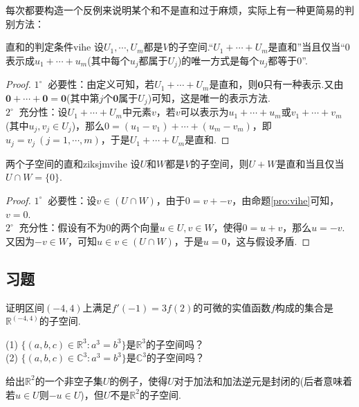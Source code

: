 \documentclass[lang=cn, zihao=5]{elegantbook}
\newcommand{\R}{\mathbb{R}}
\newcommand{\C}{\mathbb{C}}
\newcommand{\buzhou}[1]{$#1^{\circ} \ $}
\begin{document}
每次都要构造一个反例来说明某个和不是直和过于麻烦，实际上有一种更简易的判别方法：

\begin{proposition}{直和的判定条件}{vihe}
    设$U_1,\cdots ,U_m$都是$V$的子空间.“$U_1 + \cdots + U_m$是直和”当且仅当“$0$表示成$u_1+\cdots +u_m$(其中每个$u_j$都属于$U_j$)的唯一方式是每个$u_j$都等于$0$”.
\end{proposition}
\begin{proof}
    \buzhou{1} 必要性：由定义可知，若$U_1 + \cdots + U_m$是直和，则$\boldsymbol{0}$只有一种表示.又由$\boldsymbol{0} + \cdots + \boldsymbol{0} = \boldsymbol{0}$(其中第$j$个$\boldsymbol{0}$属于$U_j$)可知，这是唯一的表示方法. \\
    \buzhou{2} 充分性：设$U_1 + \cdots + U_m$中元素$v$，若$v$可以表示为$u_1 + \cdots + u_m$或$v_1 + \cdots + v_m$(其中$u_j,v_j \in U_j$)，那么$0 = (u_1 - v_1) + \cdots + (u_m - v_m)$，即$u_j=v_j ~(j=1,\cdots ,m)$，于是$U_1 + \cdots + U_m$是直和.
\end{proof}

\begin{proposition}{两个子空间的直和}{ziksjmvihe}
    设$U$和$W$都是$V$的子空间，则$U+W$是直和当且仅当$U \cap W = \{ 0 \}$.
\end{proposition}
\begin{proof}
    \buzhou{1} 必要性：设$v \in (U \cap W)$，由于$0 = v + -v$，由命题\ref{pro:vihe}可知，$v = 0$. \\
    \buzhou{2} 充分性：假设有不为$0$的两个向量$u \in U,v \in W$，使得$0 = u + v$，那么$u = -v$.又因为$-v \in W$，可知$u \in v \in (U \cap W)$，于是$u=0$，这与假设矛盾.
\end{proof}

\subsection*{习题}

\begin{exercise}
	证明区间$(-4,4)$上满足$f'(-1)=3f(2)$的可微的实值函数$f$构成的集合是$\R ^{(-4,4)}$的子空间.
\end{exercise}

\begin{exercise}
	(1) $\{ (a,b,c) \in \R ^{3} : a^3 = b^3 \}$是$\R ^{3}$的子空间吗？ \\
	(2) $\{ (a,b,c) \in \C ^{3} : a^3 = b^3 \}$是$\C ^{3}$的子空间吗？
\end{exercise}

\begin{exercise}
	给出$\R ^2$的一个非空子集$U$的例子，使得$U$对于加法和加法逆元是封闭的(后者意味着若$u \in U$则$-u \in U$)，但$U$不是$\R ^2$的子空间.
\end{exercise}
\end{document}
